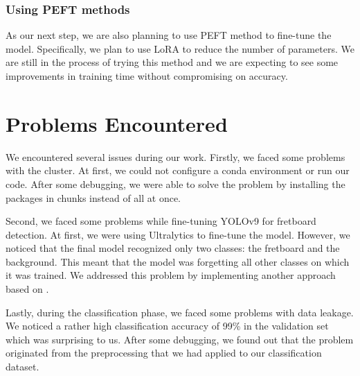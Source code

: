 \documentclass[10pt,twocolumn,letterpaper]{article}
\begin{document}
\subsubsection{Using PEFT methods}
As our next step, we are also planning to use PEFT \cite{peft} method to fine-tune the model. Specifically, we plan to use LoRA to reduce the number of parameters. We are still in the process of trying this method and we are expecting to see some improvements in training time without compromising on accuracy.

\section{Problems Encountered}
We encountered several issues during our work. Firstly, we faced some problems with the cluster. At first, we could not configure a conda environment or run our code. After some debugging, we were able to solve the problem by installing the packages in chunks instead of all at once.

Second, we faced some problems while fine-tuning YOLOv9 for fretboard detection. At first, we were using Ultralytics to fine-tune the model. However, we noticed that the final model recognized only two classes: the fretboard and the background. This meant that the model was forgetting all other classes on which it was trained. We addressed this problem by implementing another approach based on \cite{Extendin94:online}.

Lastly, during the classification phase, we faced some problems with data leakage. We noticed a rather high classification accuracy of 99\% in the validation set which was surprising to us. After some debugging, we found out that the problem originated from the preprocessing that we had applied to our classification dataset.


    {\small
        
        
    }
\end{document}
